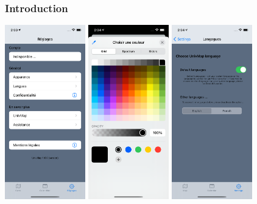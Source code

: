 \documentclass{beamer}
\begin{document}
  \begin{frame}
    \frametitle{Introduction}
    \begin{center}
      \includegraphics[width=35mm, scale=0.5]{setting.png}
      \includegraphics[width=35mm, scale=0.5]{setting_appearance.png}
      \includegraphics[width=35mm, scale=0.5]{setting_languageOn.png}
    \end{center}
    
  \end{frame}
\end{document}
